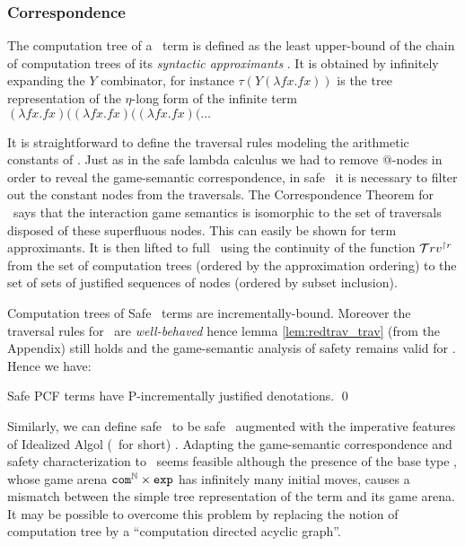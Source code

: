 \subsubsection{Correspondence}

The computation tree of a \pcf\ term is defined as the least
upper-bound of the chain of computation trees of its \emph{syntactic approximants} \cite{abramsky:game-semantics-tutorial}.  It is
obtained by infinitely expanding the $Y$ combinator,
for instance $\tau(Y (\lambda f x. f x))$ is the tree representation
of the $\eta$-long form of the infinite term $(\lambda f x. f x)
 ((\lambda f x. f x) ((\lambda f x. f x) ( \ldots$

It is straightforward to define the traversal rules modeling the
arithmetic constants of \pcf. Just as in the safe lambda calculus
we had to remove @-nodes in order to reveal the game-semantic
correspondence, in safe \pcf\ it is necessary to filter out the
constant nodes from the traversals. The Correspondence Theorem for
\pcf\ says that the interaction game semantics is isomorphic to the
set of traversals disposed of these superfluous nodes. This can easily be shown
for term approximants. It is then lifted to full \pcf\ using the continuity of the function
$\mathcal{T}rv^{\upharpoonright r}$ from the set of computation trees (ordered by the approximation ordering) to the set of sets of justified sequences of nodes (ordered by subset inclusion).


Computation trees of Safe \pcf\ terms are incrementally-bound.
Moreover the traversal rules for \pcf\ are \emph{well-behaved} hence
lemma \ref{lem:redtrav_trav} (from the Appendix) still holds and the game-semantic
analysis of safety remains valid for \pcf. Hence we have:
\begin{theorem}
\label{thm:safepcfpincr}
Safe PCF terms have P-incrementally justified denotations. \qed
\end{theorem}

Similarly, we can define safe \ialgol\ to be safe \pcf\ augmented with
the imperative features of Idealized Algol (\ialgol\ for short)
\cite{Reynolds81}.  Adapting the game-semantic correspondence and
safety characterization to \ialgol\ seems feasible although the
presence of the base type \iavar, whose game arena $\texttt{com}^{\mathbb{N}}
\times \texttt{exp}$ has infinitely many initial moves, causes a mismatch
between the simple tree representation of the term and its game
arena. It may be possible to overcome this problem by replacing the
notion of computation tree by a ``computation directed acyclic
graph''.

